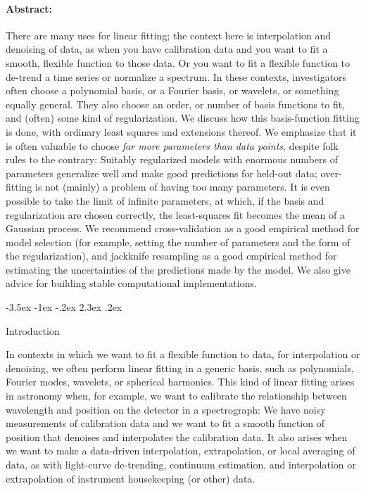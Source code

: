 \documentclass[12pt,letterpaper]{article}
\makeatletter
\renewcommand\section{\@startsection {section}{1}{\z@}%
  {-3.5ex \@plus -1ex \@minus -.2ex}%
  {2.3ex \@plus.2ex}%
  {\raggedright\normalfont\Large\bfseries}}
\makeatother
\begin{document}
\paragraph{Abstract:} There are many uses for linear fitting; the context here is interpolation and denoising of data, as when you have calibration data and you want to fit a smooth, flexible function to those data.
Or you want to fit a flexible function to de-trend a time series or normalize a spectrum.
In these contexts, investigators often choose a polynomial basis, or a Fourier basis, or wavelets, or something equally general.
They also choose an order, or number of basis functions to fit, and (often) some kind of regularization.
We discuss how this basis-function fitting is done, with ordinary least squares and extensions thereof.
We emphasize that it is often valuable to choose \emph{far more parameters than data points}, despite folk rules to the contrary:
Suitably regularized models with enormous numbers of parameters generalize well and make good predictions for held-out data; over-fitting is not (mainly) a problem of having too many parameters.
It is even possible to take the limit of infinite parameters, at which, if the basis and regularization are chosen correctly, the least-squares fit becomes the mean of a Gaussian process.
We recommend cross-validation as a good empirical method for model selection (for example, setting the number of parameters and the form of the regularization),
and jackknife resampling as a good empirical method for estimating the uncertainties of the predictions made by the model.
We also give advice for building stable computational implementations.

\section{Introduction}

In contexts in which we want to fit a flexible function to data, for interpolation or denoising, we often perform linear fitting in a generic basis, such as polynomials, Fourier modes, wavelets, or spherical harmonics.
This kind of linear fitting arises in astronomy when, for example, we want to calibrate the relationship between wavelength and position on the detector in a spectrograph:
We have noisy measurements of calibration data and we want to fit a smooth function of position that denoises and interpolates the calibration data.
It also arises when we want to make a data-driven interpolation, extrapolation, or local averaging of data, as with light-curve de-trending, continuum estimation, and interpolation or extrapolation of instrument housekeeping (or other) data.
\end{document}

